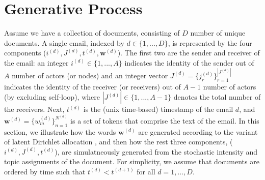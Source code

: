 \documentclass[a4paper]{article}
\begin{document}
\begin{comment}
Since Latent Dirichlet Allocation \citep{Blei2003}, which models of words alone, a variety of useful topic models have been developed by considering additional components other than words. One direction incorporated the network aspect by using the author and receiver information such as Author-Topic Models \citep{rosen2004author}, Author-Recipient-Topic Models and Role-Author-Recipient-Topic Models \citep{mccallum2005topic}, however, all of the models treat the author and recipients as observed variable thus generative processes only involve topics and words in a document. On the other side, there have been a lot of topic
models that focus on the timestamps of documents. For example, Dynamic Topic Models \citep{blei2006dynamic} introduced logistic normal topic models that rely on Markov assumptions with discretization of time, and Topics Over Time \citep{wang2006topics} suggested a countinuous-time model by generating a timestamp from the Beta distribution with its parameter depending on each topic assignment. However none of the above mentioned topic models are jointly dealing with the author-recipient and timestamps of the documents, although it is common in the field of dynamic network analysis to study who connects to whom and when $(i, j, t)$. 
\end{comment}

\section{Generative Process} \label{sec: Generative Process}
Assume we have a collection of documents, consisting of $D$ number of unique documents. A single email, indexed by $d \in \{1,...,D\}$, is represented by the four components ($i^{(d)}, J^{(d)}, t^{(d)},  \boldsymbol{w}^{(d)}$). The first two are the sender and receiver of the email: an integer $i^{(d)} \in \{1,...,A\}$ indicates the identity of the sender out of $A$ number of actors (or nodes) and an integer vector $J^{(d)} = \{j_r^{(d)}\}_{r=1}^{|J^{(d)}|} $ indicates the identity of the receiver (or receivers) out of $A-1$ number of actors (by excluding self-loop), where $|J^{(d)}|\in \{1,...,A-1\}$ denotes the total number of the receivers. Next, $t^{(d)}$ is the (unix time-based) timestamp of the email $d$, and $\boldsymbol{w}^{(d)} = \{w^{(d)}_m \}_{n=1}^{N^{(d)}}$ is a set of tokens that comprise the text of the email. In this section, we illustrate how the words $\boldsymbol{w}^{(d)}$ are generated according to the variant of latent Dirichlet allocation \citep{Blei2003}, and then how the rest three components, ($i^{(d)}, J^{(d)}, t^{(d)}$), are simulatneously generated from the stochastic intensity and topic assignments of the document. For simplicity, we assume that documents are ordered by time such that $t^{(d)} < t^{(d+1)}$ for all $d=1, ..., D$.
\end{document}
